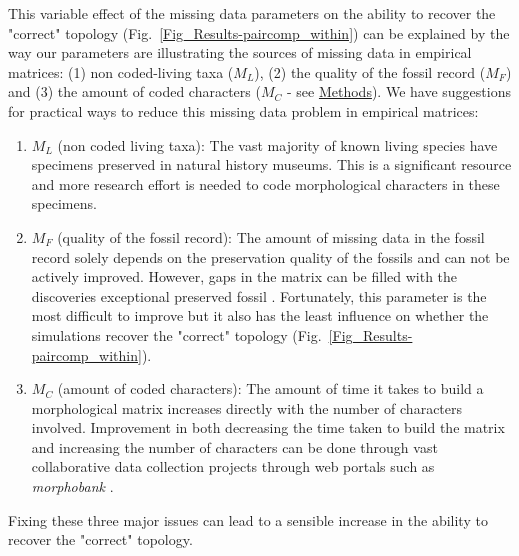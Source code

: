 \documentclass[12pt,letterpaper]{article}
\begin{document}

This variable effect of the missing data parameters on the ability to recover the "correct" topology (Fig.~\ref{Fig_Results-paircomp_within}) can be explained by the way our parameters are illustrating the sources of missing data in empirical matrices: (1) non coded-living  taxa ($M_{L}$), (2) the quality of the fossil record ($M_{F}$) and (3) the amount of coded characters ($M_{C}$ - see \hyperref[Removing_data]{Methods}). We have suggestions for practical ways to reduce this missing data problem in empirical matrices:
\begin{enumerate}
\item{$M_{L}$ (non coded living taxa):}
The vast majority of known living species have specimens preserved in natural history museums. This is a significant resource and more research effort is needed to code morphological characters in these specimens.
\item{$M_{F}$ (quality of the fossil record):}
The amount of missing data in the fossil record solely depends on the preservation quality of the fossils and can not be actively improved. However, gaps in the matrix can be filled with the discoveries exceptional preserved fossil \citep[e.g.][]{nithe2013}. Fortunately, this parameter is the most difficult to improve but it also has the least influence on whether the simulations recover the "correct" topology (Fig.~\ref{Fig_Results-paircomp_within}).
\item{$M_{C}$ (amount of coded characters):}
The amount of time it takes to build a morphological matrix increases directly with the number of characters involved. Improvement in both decreasing the time taken to build the matrix and increasing the number of characters can be done through vast collaborative data collection projects through web portals such as \textit{morphobank} \citep{morphobank}.
\end{enumerate}
Fixing these three major issues can lead to a sensible increase in the ability to recover the "correct" topology.

\end{document}

